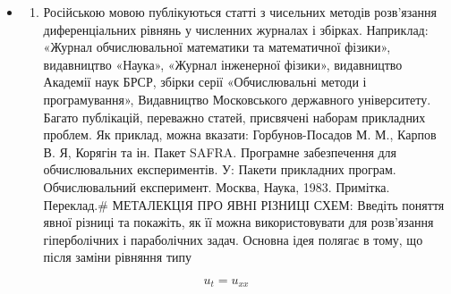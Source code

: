 \documentclass[
  ukrainian,
]{article}
\providecommand{\tightlist}{%
  \setlength{\itemsep}{0pt}\setlength{\parskip}{0pt}}
\begin{document}
\begin{itemize}
\tightlist
\item
  \begin{enumerate}
  \def\labelenumi{\arabic{enumi})}
  \tightlist
  \item
    Російською мовою публікуються статті з чисельних методів розв'язання
    диференціальних рівнянь у численних журналах і збірках. Наприклад:
    «Журнал обчислювальної математики та математичної фізики»,
    видавництво «Наука», «Журнал інженерної фізики», видавництво
    Академії наук БРСР, збірки серії «Обчислювальні методи і
    програмування», Видавництво Московського державного університету.
    Багато публікацій, переважно статей, присвячені наборам прикладних
    проблем. Як приклад, можна вказати: Горбунов-Посадов М. М., Карпов
    В. Я, Корягін та ін. Пакет SAFRA. Програмне забезпечення для
    обчислювальних експериментів. У: Пакети прикладних програм.
    Обчислювальний експеримент. Москва, Наука, 1983. Примітка.
    Переклад.\# МЕТАЛЕКЦІЯ ПРО ЯВНІ РІЗНИЦІ СХЕМ: Введіть поняття явної
    різниці та покажіть, як її можна використовувати для розв'язання
    гіперболічних і параболічних задач. Основна ідея полягає в тому, що
    після заміни рівняння типу
  \end{enumerate}
\end{itemize}

\[
u_t = u_{xx}
\]
\end{document}
